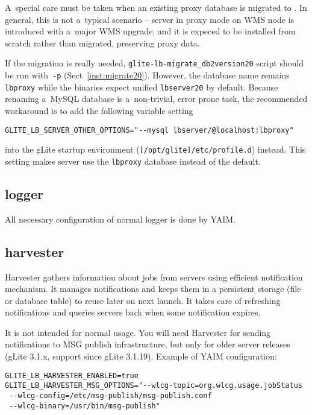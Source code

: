 A~special care must be taken when an existing \LB proxy database
is migrated to .
In general, this is not a~typical scenario --  server in proxy mode
on WMS node is introduced with a~major WMS upgrade, and it is expeced
to be installed from scratch rather than migrated, preserving \LB proxy data.

If the migration is really needed, \verb'glite-lb-migrate_db2version20'
script should be run with~\verb'-p' (Sect~\ref{inst:migrate20}).
However, the \LB database name remains \verb'lbproxy' while
the  binaries expect unified \verb'lbserver20' by default.
Because renaming a~MySQL database is a~non-trivial, error prone task,
the recommended workaround is to add the following variable setting

\verb'GLITE_LB_SERVER_OTHER_OPTIONS="--mysql lbserver/@localhost:lbproxy"' 

into the gLite startup environment (\verb'[/opt/glite]/etc/profile.d') instead.
This setting makes \LB server use the \verb'lbproxy' database instead of the default.

\subsection{\LB logger}

All necessary configuration of normal \LB logger is done by YAIM.

\subsection{\LB harvester}

\LB Harvester gathers information about jobs from \LB servers using efficient
\LB notification mechanism. It manages notifications and keeps them in
a persistent storage (file or database table) to reuse later on next launch.
It takes care of refreshing notifications and queries \LB servers back when
some notification expires.

It is not intended for normal usage. You will need Harvester for sending notifications to MSG publish infrastructure, but only for older \LB server releases (gLite 3.1.x, support since gLite 3.1.19). Example of YAIM configuration:

\begin{verbatim}
GLITE_LB_HARVESTER_ENABLED=true
GLITE_LB_HARVESTER_MSG_OPTIONS="--wlcg-topic=org.wlcg.usage.jobStatus 
 --wlcg-config=/etc/msg-publish/msg-publish.conf 
 --wlcg-binary=/usr/bin/msg-publish"
\end{verbatim}

